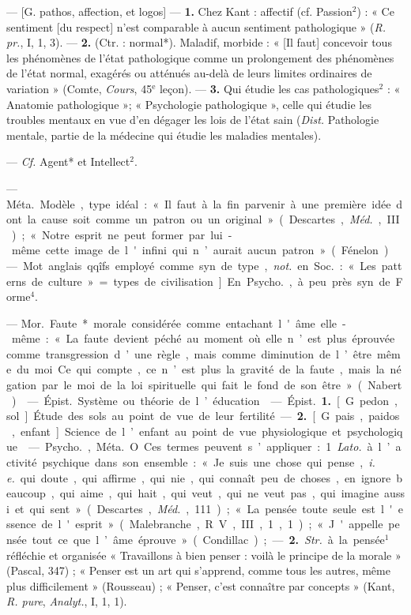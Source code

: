 \begin{itemize}[leftmargin=1cm, label=, itemsep=1pt]
 — [G. pathos, affection, et
logos] — {\bf 1.} Chez Kant : affectif (cf.
Passion$^2$) : « Ce sentiment [du respect] n’est comparable à aucun sentiment pathologique » ({\it R. pr.}, I,
1, 3). — {\bf 2.} (Ctr. : normal*). Maladif,
morbide : « [Il faut] concevoir tous
les phénomènes de l’état pathologique comme un prolongement des
phénomènes de l'état normal, exagérés ou atténués au-delà de leurs
limites ordinaires de variation »
(Comte, {\it Cours}, 45$^\text{e}$ leçon). — {\bf 3.} Qui
étudie les cas pathologiques$^2$ : « Anatomie pathologique »; « Psychologie
pathologique », celle qui étudie les
troubles mentaux en vue d'en dégager les lois de l'état sain ({\it Dist.}
Pathologie mentale, partie de la médecine qui étudie les maladies mentales).

 — {\it Cf.} Agent* et Intellect$^2$.

 — \si{Méta.} Modèle, type idéal :
« Il faut à la fin parvenir à une première idée dont la cause soit comme
un patron ou un original... » (Descartes, \si{{\it Méd.}}, III) ; « Notre esprit ne
peut former par lui-même cette
image de l'infini qui n’aurait aucun
patron » (Fénelon).

 — Mot anglais qqîfs employé
comme syn. de type, {\it not.} en \si{Soc.} :
« Les patterns de culture » = types
de civilisation]. En \si{Psycho.}, à peu
près syn. de Forme$^4$.

 — \si{Mor.} Faute* morale considérée
comme entachant l'âme elle-même : « La faute devient péché
au moment où elle n’est plus éprouvée comme transgression d’une
règle, mais comme diminution de
l’être même du moi. Ce qui compte,
ce n’est plus la gravité de la faute,
mais la négation par le moi de la loi
spirituelle qui fait le fond de son
être » (Nabert).

 — \si{Épist.} Système ou
théorie de l’éducation.

 — \si{Épist.} {\bf 1.} [G. pedon, sol].
Étude des sols au point de vue de
leur fertilité. — {\bf 2.} [G. pais, paidos,
enfant]. Science de l’enfant au point
de vue physiologique et psychologique.

 — \si{Psycho.}, \si{Méta.} O.
Ces termes peuvent s’appliquer :
1. {\it Lato.} à l’activité psychique dans
son ensemble : « Je suis une chose
qui pense, {\it i. e.} qui doute, qui
affirme, qui nie, qui connaît peu de
choses, en ignore beaucoup, qui
aime, qui hait, qui veut, qui ne veut
pas, qui imagine aussi et qui sent »
(Descartes, \si{{\it Méd.}}, 111) ; « La pensée
toute seule est l'essence de l'esprit »
(Malebranche, R. V., III, 1, 1) ;
« J'appelle pensée tout ce que l’âme
éprouve » (Condillac) ; — {\bf 2.} {\it Str.} à
la pensée$^1$ réfléchie et organisée
« Travaillons à bien penser : voilà le
principe de la morale » (Pascal, 347) ;
« Penser est un art qui s’apprend,
comme tous les autres, même plus
difficilement » (Rousseau) ; « Penser,
c’est connaître par concepts »
(Kant, {\it R. pure}, {\it Analyt.}, I, 1, 1).


\end{itemize}
